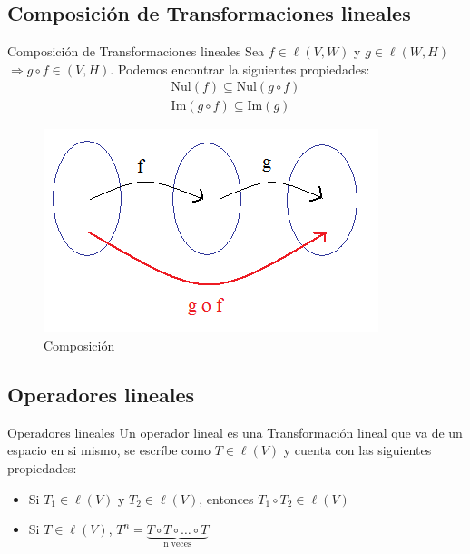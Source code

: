 \documentclass[a4paper, twoside]{article}
\numberwithin{equation}{section}
\numberwithin{figure}{section}
\numberwithin{table}{section}
\newcommand{\nul}[1]{\text{Nul}(#1)}
\newcommand{\im}[1]{\text{Im}(#1)}
\begin{document}
\subsection{Composición de Transformaciones lineales}
\begin{minipage}{0.6\textwidth}
	\begin{definicion*}{Composición de Transformaciones lineales}
		Sea $f \in \ell (V,W)$ y $g \in \ell (W,H)$ $\Rightarrow g \circ f \in (V,H)$. Podemos encontrar la siguientes propiedades:
		\begin{align}
			\nul{f} \subseteq \nul{g \circ f} \\
			\im{g \circ f} \subseteq \im{g}
		\end{align}
	\end{definicion*}
\end{minipage}
\begin{minipage}{0.3\textwidth}
	\begin{figure}[H]
		\centering
		\includegraphics[scale=0.3]{composicion}
		\caption{Composición}
	\end{figure}
\end{minipage}

\subsection{Operadores lineales}
\begin{definicion*}{Operadores lineales}
	Un operador lineal es una Transformación lineal que va de un espacio en si mismo, se escríbe como $T \in \ell (V)$ y cuenta con las siguientes propiedades:
	\begin{itemize}
		\item Si $T_1 \in \ell (V)$ y $T_2 \in \ell (V)$, entonces $T_1 \circ T_2 \in \ell (V)$
		\item Si $T \in \ell (V)$, $T^n=\underbrace{T \circ T \circ \ldots \circ T}_{\text{n veces}}$
	\end{itemize}
\end{definicion*}
\end{document}

